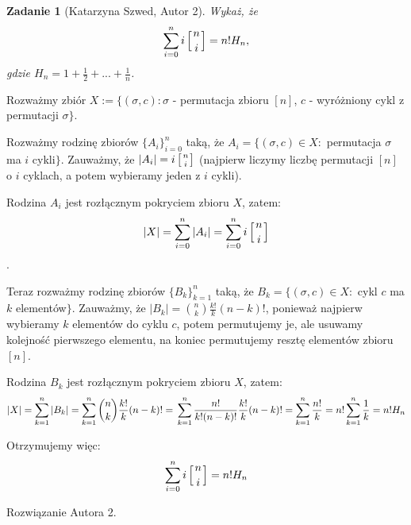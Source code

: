 \documentclass{mwart}
\newtheorem{zad}{Zadanie}[section]
\begin{document}
\begin{zad}[Katarzyna Szwed, Autor 2]
    Wykaż, że
    \[
        \sum_{i=0}^{n} i \left[ n \atop i \right] = n! H_n,
    \]
    gdzie $H_n = 1 + \frac{1}{2} + ... + \frac{1}{n}$.
\end{zad}
\begin{mdframed}
    Rozważmy zbiór $X := \{(\sigma, c) : \sigma$ - permutacja zbioru $[n]$, $c$ - wyróżniony cykl z permutacji $\sigma\}$.

    Rozważmy rodzinę zbiorów $\{A_i\}_{i=0}^{n}$ taką, że $A_i = \{(\sigma, c) \in X :$ permutacja $\sigma$ ma $i$ cykli$\}$. 
    Zauważmy, że $|A_i| = i\left[ n \atop i\right]$ (najpierw liczymy liczbę permutacji $[n]$ o $i$ cyklach, a potem wybieramy
    jeden z $i$ cykli). 
    
    Rodzina $A_i$ jest rozłącznym pokryciem zbioru $X$, zatem: 
    \[|X| = \sum_{i=0}^{n} |A_i| = \sum_{i=0}^{n} i\left[ n \atop i\right]\].

    Teraz rozważmy rodzinę zbiorów $\{B_k\}_{k=1}^{n}$ taką, że $B_k = \{(\sigma, c) \in X :$ cykl $c$ ma $k$ elementów$\}$. 
    Zauważmy, że $|B_k| = {n \choose k} \frac{k!}{k} (n-k)!$, ponieważ najpierw wybieramy $k$ elementów do cyklu $c$, potem permutujemy
    je, ale usuwamy kolejność pierwszego elementu, na koniec permutujemy resztę elementów zbioru $[n]$.

    Rodzina $B_k$ jest rozłącznym pokryciem zbioru $X$, zatem:
    \[
        |X| = \sum_{k=1}^{n} |B_k| = \sum_{k=1}^{n} {n \choose k} \frac{k!}{k} (n-k)! = \\
        \sum_{k=1}^n \frac{n!}{k!(n-k)!}\frac{k!}{k} (n-k)! = \sum_{k=1}^{n}\frac{n!}{k} = 
        n! \sum_{k=1}^{n} \frac{1}{k} = n! H_n
    \]

    Otrzymujemy więc:
    \[\sum_{i=0}^{n} i\left[ n \atop i\right] = n! H_n\]


\end{mdframed}
\begin{mdframed}
    Rozwiązanie Autora 2.
\end{mdframed}
\end{document}
